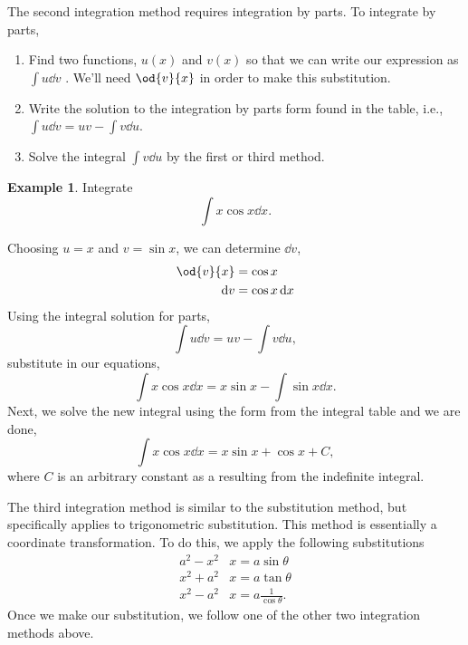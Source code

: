 \documentclass[final,a4paper,12pt]{article}
\theoremstyle{definition}
\newtheorem{example}{Example}[section]
\begin{document}
The second integration method requires integration by parts.  To integrate by
parts,
\begin{enumerate}
    \item Find two functions, $u(x)$ and $v(x)$ so that we can write our
    expression as $\int u \dd{v}$ .  We'll need $\od{v}{x}$ in order to make this
    substitution.
    \item Write the solution to the integration by parts form found in the
    table, i.e., $\int u \dd{v} = u v - \int v \dd{u}$.
    \item Solve the integral $\int v \dd{u}$ by the first or third method.
\end{enumerate}

\begin{example}
    Integrate
    \begin{equation*}
        \int x \cos x \dd{x} .
    \end{equation*}

    Choosing $u = x$ and $v = \sin x$, we can determine $\dd{v}$,
    \begin{align*}
        \od{v}{x} &= \cos x \\
        \dd{v} &= \cos x \dd{x}
    \end{align*}
    Using the integral solution for parts,
    \begin{equation}
        \int u \dd{v} = u v - \int v \dd{u} ,
    \end{equation}
    substitute in our equations,
    \begin{equation*}
        \int x \cos x \dd{x} = x \sin x - \int \sin x \dd{x} .
    \end{equation*}
    Next, we solve the new integral using the form from the integral table and
    we are done,
    \begin{equation*}
        \int x \cos x \dd{x} = x \sin x + \cos x + C,
    \end{equation*}
    where $C$ is an arbitrary constant as a resulting from the indefinite
    integral.
\end{example}

The third integration method is similar to the substitution method, but
specifically applies to trigonometric substitution.  This method is essentially
a coordinate transformation.  To do this, we apply the following substitutions
\begin{align}
    a^2 - x^2 & x = a \sin \theta \\
    x^2 + a^2 & x = a \tan \theta \\
    x^2 - a^2 & x = a \frac{1}{\cos \theta} .
\end{align}
Once we make our substitution, we follow one of the other two integration
methods above.
\end{document}
